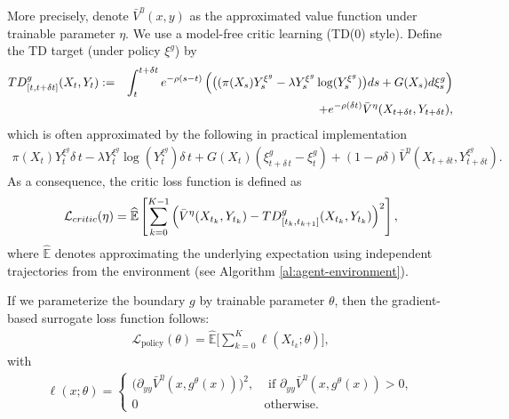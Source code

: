 \documentclass[11pt]{amsart}
\theoremstyle{plain}
\def \dd{{\rm d}}
\numberwithin{equation}{section}
\begin{document}
{More precisely, denote $\bar{V}^{\eta}(x,y)$ as the approximated value function under trainable parameter $\eta$. We use a model-free critic learning (TD(0) style). Define the TD target (under policy $\xi^g$) by
\begin{eqnarray*}
    {\rm TD}^g_{[t,t+\delta t]}(X_t,Y_t) &:=& \int_t^{t+\delta t}  e^{- \rho (s-t)} \left(\big( ( \pi (X_{s} )Y_{s}^{\xi^g}-\lambda Y_{s}^{\xi^g} \log  (Y_{s}^{\xi^g} ) \big) \dd s 
+   G(X_s) \dd\xi_s^g\right) \\
&&+e^{-\rho (\delta t)}\bar V^\eta(X_{t+\delta t},Y_{t+\delta t}),
\end{eqnarray*}
which is often approximated by the following in practical implementation
\begin{eqnarray*}
    \pi(X_t)Y^{\xi^g}_t\delta\, t-\lambda Y^{\xi^g}_t \log (Y^{\xi^g}_t) \delta\, t + G(X_t) (\xi^g_{t+\delta\,t}-\xi^g_t) + (1-\rho\delta)  \bar V^\eta(X_{t+\delta t},Y^{\xi^g}_{t+\delta t}).
\end{eqnarray*}
As a consequence, the critic loss function is defined as  
\begin{eqnarray}\label{eq:critic_loss}
    \mathcal{L}_{\textrm{critic}}(\eta) = \widehat{\mathbb{E}}\left[\sum_{k=0}^{K-1} \left(\bar V^\eta(X_{t_k},Y_{t_k})-{\rm TD}^g_{[t_k,t_{k+1}]}(X_{t_k},Y_{t_k})\right)^2\right],
\end{eqnarray}
where $\widehat{\mathbb{E}}$ denotes approximating the underlying expectation using independent trajectories from the environment (see Algorithm \ref{al:agent-environment}).
}


If we parameterize the boundary $g$ by trainable parameter $\theta$, then the gradient-based surrogate loss function follows:
\begin{eqnarray}\label{eq:actor_loss}
    \mathcal{L}_{\textrm{policy}} (\theta) = \widehat{\mathbb{E}}\Big[\sum_{k=0}^K\ell (X_{t_k};\theta)\Big],
\end{eqnarray}
with 
\begin{eqnarray*}
 \ell (x;\theta) = \begin{cases}
     \Big(\partial_{yy}\bar V^\eta (x,g^\theta(x))\Big)^2, &\textrm{ if } \partial_{yy} \bar V^\eta (x,g^\theta(x)) >0,\\
     0 & \textrm{otherwise}.
 \end{cases}   
\end{eqnarray*}
\end{document}
